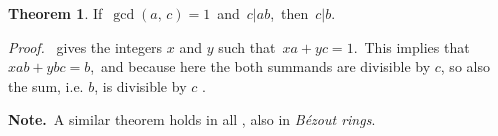 \documentclass[12pt]{article}
\theoremstyle{definition}
\newtheorem*{thmplain}{Theorem}
\begin{document}
\begin{thmplain}
\;If \,$\gcd(a,\,c) = 1$\, and \,$c|ab$, \,then \,$c|b$.
\end{thmplain}
{\em Proof.} \, gives the integers $x$ and $y$ such that 
\,$xa+yc = 1$. \,This implies that \,$xab+ybc = b$, \,and because here the both summands are divisible by $c$, so also the sum, i.e. $b$, is divisible by $c$ .

\textbf{Note.} \,A similar theorem holds in all , also in {\em B\'ezout rings}.
\end{document}
